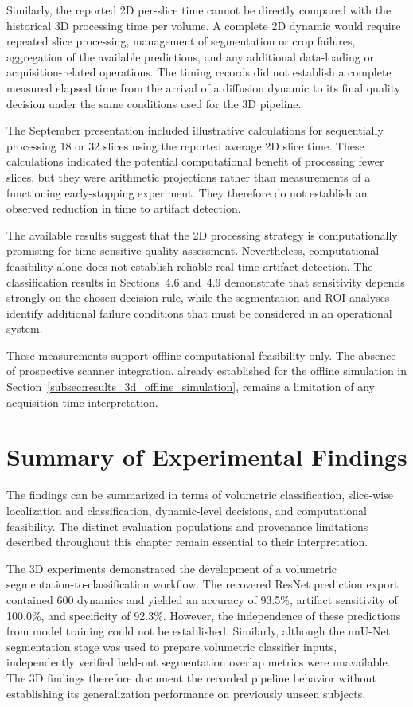Similarly, the reported 2D per-slice time cannot be directly compared with the historical 3D processing time per volume. A complete 2D dynamic would require repeated slice processing, management of segmentation or crop failures, aggregation of the available predictions, and any additional data-loading or acquisition-related operations. The timing records did not establish a complete measured elapsed time from the arrival of a diffusion dynamic to its final quality decision under the same conditions used for the 3D pipeline.

The September presentation included illustrative calculations for sequentially processing 18 or 32 slices using the reported average 2D slice time. These calculations indicated the potential computational benefit of processing fewer slices, but they were arithmetic projections rather than measurements of a functioning early-stopping experiment. They therefore do not establish an observed reduction in time to artifact detection.

The available results suggest that the 2D processing strategy is computationally promising for time-sensitive quality assessment. Nevertheless, computational feasibility alone does not establish reliable real-time artifact detection. The classification results in Sections~4.6 and~4.9 demonstrate that sensitivity depends strongly on the chosen decision rule, while the segmentation and ROI analyses identify additional failure conditions that must be considered in an operational system.

These measurements support offline computational feasibility only. The absence of prospective scanner integration, already established for the offline simulation in Section~\ref{subsec:results_3d_offline_simulation}, remains a limitation of any acquisition-time interpretation.

\section{Summary of Experimental Findings}
\label{sec:results_summary}

The findings can be summarized in terms of volumetric classification, slice-wise localization and classification, dynamic-level decisions, and computational feasibility. The distinct evaluation populations and provenance limitations described throughout this chapter remain essential to their interpretation.

The 3D experiments demonstrated the development of a volumetric segmentation-to-classification workflow. The recovered ResNet prediction export contained 600 dynamics and yielded an accuracy of 93.5\%, artifact sensitivity of 100.0\%, and specificity of 92.3\%. However, the independence of these predictions from model training could not be established. Similarly, although the nnU-Net segmentation stage was used to prepare volumetric classifier inputs, independently verified held-out segmentation overlap metrics were unavailable. The 3D findings therefore document the recorded pipeline behavior without establishing its generalization performance on previously unseen subjects.

